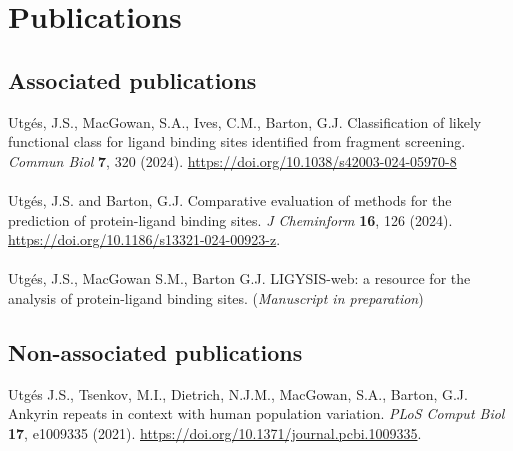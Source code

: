 \chapter*{Publications}

\section*{Associated publications}

Utgés, J.S., MacGowan, S.A., Ives, C.M., Barton, G.J. Classification of likely functional class for ligand binding sites identified from fragment screening. \textit{Commun Biol} \textbf{7}, 320 (2024). \url{https://doi.org/10.1038/s42003-024-05970-8}
\\\\ 
\noindent
Utgés, J.S. and Barton, G.J. Comparative evaluation of methods for the prediction of protein-ligand binding sites. \textit{J Cheminform} \textbf{16}, 126 (2024). \url{https://doi.org/10.1186/s13321-024-00923-z}.
\\\\ 
\noindent
Utgés, J.S., MacGowan S.M., Barton G.J. LIGYSIS-web: a resource for the analysis of protein-ligand binding sites. (\textit{Manuscript in preparation})

\section*{Non-associated publications}

Utgés J.S., Tsenkov, M.I., Dietrich, N.J.M., MacGowan, S.A., Barton, G.J. Ankyrin repeats in context with human population variation. \textit{PLoS Comput Biol} \textbf{17}, e1009335 (2021). \url{https://doi.org/10.1371/journal.pcbi.1009335}.